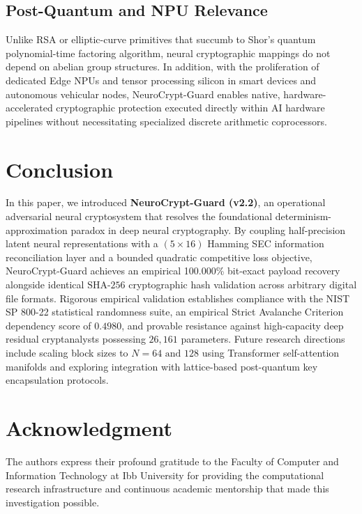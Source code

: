 \documentclass[journal,10pt,twocolumn]{IEEEtran}
\begin{document}
\subsection{Post-Quantum and NPU Relevance}
Unlike RSA or elliptic-curve primitives that succumb to Shor's quantum polynomial-time factoring algorithm, neural cryptographic mappings do not depend on abelian group structures. In addition, with the proliferation of dedicated Edge NPUs and tensor processing silicon in smart devices and autonomous vehicular nodes, NeuroCrypt-Guard enables native, hardware-accelerated cryptographic protection executed directly within AI hardware pipelines without necessitating specialized discrete arithmetic coprocessors.

\section{Conclusion}
In this paper, we introduced \textbf{NeuroCrypt-Guard (v2.2)}, an operational adversarial neural cryptosystem that resolves the foundational determinism-approximation paradox in deep neural cryptography. By coupling half-precision latent neural representations with a $(5 \times 16)$ Hamming SEC information reconciliation layer and a bounded quadratic competitive loss objective, NeuroCrypt-Guard achieves an empirical 100.000\% bit-exact payload recovery alongside identical $\text{SHA-256}$ cryptographic hash validation across arbitrary digital file formats. Rigorous empirical validation establishes compliance with the NIST SP 800-22 statistical randomness suite, an empirical Strict Avalanche Criterion dependency score of $0.4980$, and provable resistance against high-capacity deep residual cryptanalysts possessing $26,161$ parameters. Future research directions include scaling block sizes to $N=64 \text{ and } 128$ using Transformer self-attention manifolds and exploring integration with lattice-based post-quantum key encapsulation protocols.

\section*{Acknowledgment}
The authors express their profound gratitude to the Faculty of Computer and Information Technology at Ibb University for providing the computational research infrastructure and continuous academic mentorship that made this investigation possible.



\end{document}
